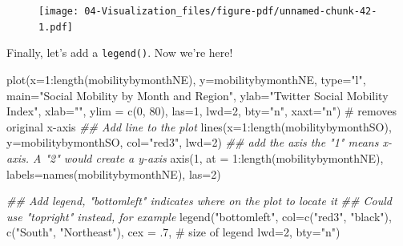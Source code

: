 \documentclass[
  letterpaper,
  DIV=11,
  numbers=noendperiod]{scrreprt}
\newenvironment{Shaded}{\begin{snugshade}}{\end{snugshade}}
\newcommand{\AttributeTok}[1]{\textcolor[rgb]{0.40,0.45,0.13}{#1}}
\newcommand{\CommentTok}[1]{\textcolor[rgb]{0.37,0.37,0.37}{#1}}
\newcommand{\DecValTok}[1]{\textcolor[rgb]{0.68,0.00,0.00}{#1}}
\newcommand{\DocumentationTok}[1]{\textcolor[rgb]{0.37,0.37,0.37}{\textit{#1}}}
\newcommand{\FunctionTok}[1]{\textcolor[rgb]{0.28,0.35,0.67}{#1}}
\newcommand{\NormalTok}[1]{\textcolor[rgb]{0.00,0.23,0.31}{#1}}
\newcommand{\SpecialCharTok}[1]{\textcolor[rgb]{0.37,0.37,0.37}{#1}}
\newcommand{\StringTok}[1]{\textcolor[rgb]{0.13,0.47,0.30}{#1}}
\begin{document}
\begin{figure}[H]

{\centering \texttt{[image: 04-Visualization\_files/figure-pdf/unnamed-chunk-42-1.pdf]}

}

\end{figure}

Finally, let's add a \texttt{legend()}. Now we're here!

\begin{Shaded}
\begin{Highlighting}[]
\FunctionTok{plot}\NormalTok{(}\AttributeTok{x=}\DecValTok{1}\SpecialCharTok{:}\FunctionTok{length}\NormalTok{(mobilitybymonthNE),}
     \AttributeTok{y=}\NormalTok{mobilitybymonthNE,}
     \AttributeTok{type=}\StringTok{"l"}\NormalTok{, }
     \AttributeTok{main=}\StringTok{"Social Mobility by Month and Region"}\NormalTok{,}
     \AttributeTok{ylab=}\StringTok{"Twitter Social Mobility Index"}\NormalTok{,}
     \AttributeTok{xlab=}\StringTok{""}\NormalTok{,}
     \AttributeTok{ylim =} \FunctionTok{c}\NormalTok{(}\DecValTok{0}\NormalTok{, }\DecValTok{80}\NormalTok{),}
     \AttributeTok{las=}\DecValTok{1}\NormalTok{, }
     \AttributeTok{lwd=}\DecValTok{2}\NormalTok{, }
     \AttributeTok{bty=}\StringTok{"n"}\NormalTok{,}
     \AttributeTok{xaxt=}\StringTok{"n"}\NormalTok{) }\CommentTok{\# removes original x{-}axis}
\DocumentationTok{\#\# Add line to the plot }
\FunctionTok{lines}\NormalTok{(}\AttributeTok{x=}\DecValTok{1}\SpecialCharTok{:}\FunctionTok{length}\NormalTok{(mobilitybymonthSO),}
     \AttributeTok{y=}\NormalTok{mobilitybymonthSO, }\AttributeTok{col=}\StringTok{"red3"}\NormalTok{, }\AttributeTok{lwd=}\DecValTok{2}\NormalTok{)}
\DocumentationTok{\#\# add the axis the "1" means x{-}axis. A "2" would create a y{-}axis}
\FunctionTok{axis}\NormalTok{(}\DecValTok{1}\NormalTok{, }\AttributeTok{at =} \DecValTok{1}\SpecialCharTok{:}\FunctionTok{length}\NormalTok{(mobilitybymonthNE), }
     \AttributeTok{labels=}\FunctionTok{names}\NormalTok{(mobilitybymonthNE), }\AttributeTok{las=}\DecValTok{2}\NormalTok{)}

\DocumentationTok{\#\# Add legend, "bottomleft" indicates where on the plot to locate it}
\DocumentationTok{\#\# Could use "topright" instead, for example}
\FunctionTok{legend}\NormalTok{(}\StringTok{"bottomleft"}\NormalTok{,  }\AttributeTok{col=}\FunctionTok{c}\NormalTok{(}\StringTok{"red3"}\NormalTok{, }\StringTok{"black"}\NormalTok{), }
       \FunctionTok{c}\NormalTok{(}\StringTok{"South"}\NormalTok{, }\StringTok{"Northeast"}\NormalTok{), }
       \AttributeTok{cex =}\NormalTok{ .}\DecValTok{7}\NormalTok{, }\CommentTok{\# size of legend}
       \AttributeTok{lwd=}\DecValTok{2}\NormalTok{,}
       \AttributeTok{bty=}\StringTok{"n"}\NormalTok{)}
\end{Highlighting}
\end{Shaded}
\end{document}
